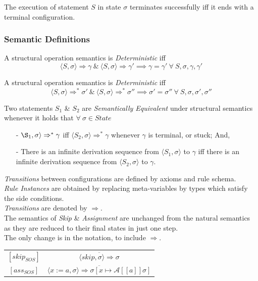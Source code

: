 \documentclass[11pt,a4paper]{article}
\begin{document}
The execution of statement $S$ in state $\sigma$ terminates successfully iff it ends with a terminal configuration.

\subsubsection{Semantic Definitions}

A structural operation semantics is \textit{Deterministic} iff
$$\langle S,\sigma\rangle\Rightarrow\gamma\ \&\ \langle S,\sigma\rangle\Rightarrow\gamma'\implies\gamma=\gamma'\ \forall\ S,\sigma,\gamma,\gamma'$$

A structural operation semantics is \textit{Deterministic} iff
$$\langle S,\sigma\rangle\Rightarrow^*\sigma'\ \&\ \langle S,\sigma\rangle\Rightarrow^*\sigma''\implies\sigma'=\sigma''\ \forall\ S,\sigma,\sigma',\sigma''$$

Two statements $S_1$ \& $S_2$ are \textit{Semantically Equivalent} under structural semantics whenever it holds that $\forall\ \sigma\in State$
\begin{itemize}
	\item[-] $\S_1,\sigma\rangle\Rightarrow^*\gamma$ iff $\langle S_2,\sigma\rangle\Rightarrow^*\gamma$ whenever $\gamma$ is terminal, or stuck; And,
	\item[-] There is an infinite derivation sequence from $\langle S_1,\sigma\rangle$ to $\gamma$ iff there is an infinite derivation sequence from $\langle S_2,\sigma\rangle$ to $\gamma$.
\end{itemize}

\textit{Transitions} between configurations are defined by axioms and rule schema.\\
\textit{Rule Instances} are obtained by replacing meta-variables by types which satisfy the side conditions.\\
\textit{Transitions} are denoted by $\Rightarrow$.\\

The semantics of \textit{Skip} \& \textit{Assignment} are unchanged from the natural semantics as they are reduced to their final states in just one step.\\
The only change is in the notation, to include $\Rightarrow$.\\
\begin{center}
\begin{tabular}{cc}
$[skip_{SOS}]$&$\overline{\langle skip,\sigma\rangle\Rightarrow\sigma}$\\
$[ass_{SOS}]$&$\overline{\langle x:=a,\sigma\rangle\Rightarrow\sigma[x\mapsto\mathcal{A}[[a]]\sigma]}$
\end{tabular}
\end{center}
\end{document}
